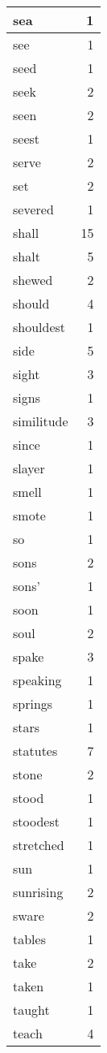 \begin{center}
\begin{longtable}{l|r}
sea & 1 \\ \hline
see & 1 \\ \hline
seed & 1 \\ \hline
seek & 2 \\ \hline
seen & 2 \\ \hline
seest & 1 \\ \hline
serve & 2 \\ \hline
set & 2 \\ \hline
severed & 1 \\ \hline
shall & 15 \\ \hline
shalt & 5 \\ \hline
shewed & 2 \\ \hline
should & 4 \\ \hline
shouldest & 1 \\ \hline
side & 5 \\ \hline
sight & 3 \\ \hline
signs & 1 \\ \hline
similitude & 3 \\ \hline
since & 1 \\ \hline
slayer & 1 \\ \hline
smell & 1 \\ \hline
smote & 1 \\ \hline
so & 1 \\ \hline
sons & 2 \\ \hline
sons' & 1 \\ \hline
soon & 1 \\ \hline
soul & 2 \\ \hline
spake & 3 \\ \hline
speaking & 1 \\ \hline
springs & 1 \\ \hline
stars & 1 \\ \hline
statutes & 7 \\ \hline
stone & 2 \\ \hline
stood & 1 \\ \hline
stoodest & 1 \\ \hline
stretched & 1 \\ \hline
sun & 1 \\ \hline
sunrising & 2 \\ \hline
sware & 2 \\ \hline
tables & 1 \\ \hline
take & 2 \\ \hline
taken & 1 \\ \hline
taught & 1 \\ \hline
teach & 4 \\ \hline

\end{longtable}
\end{center}
